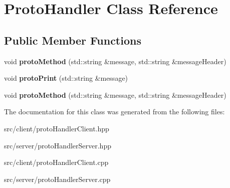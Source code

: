 \hypertarget{class_proto_handler}{}\section{Proto\+Handler Class Reference}
\label{class_proto_handler}
\subsection*{Public Member Functions}
\begin{DoxyCompactItemize}
\item 
void {\bfseries proto\+Method} (std\+::string \&message, std\+::string \&message\+Header)\hypertarget{class_proto_handler_a4fcfc152c4ec985003aed0e4a4354d73}{}\label{class_proto_handler_a4fcfc152c4ec985003aed0e4a4354d73}

\item 
void {\bfseries proto\+Print} (std\+::string \&message)\hypertarget{class_proto_handler_aab7c34f1297a4e7683ef2fd9f597ae0a}{}\label{class_proto_handler_aab7c34f1297a4e7683ef2fd9f597ae0a}

\item 
void {\bfseries proto\+Method} (std\+::string \&message, std\+::string \&message\+Header)\hypertarget{class_proto_handler_a4fcfc152c4ec985003aed0e4a4354d73}{}\label{class_proto_handler_a4fcfc152c4ec985003aed0e4a4354d73}

\end{DoxyCompactItemize}


The documentation for this class was generated from the following files\+:\begin{DoxyCompactItemize}
\item 
src/client/proto\+Handler\+Client.\+hpp\item 
src/server/proto\+Handler\+Server.\+hpp\item 
src/client/proto\+Handler\+Client.\+cpp\item 
src/server/proto\+Handler\+Server.\+cpp\end{DoxyCompactItemize}
